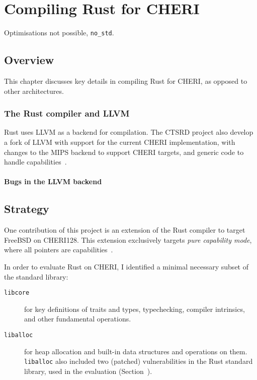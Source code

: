\documentclass[dissertation.tex]{subfiles}
\begin{document}
\chapter{Compiling Rust for CHERI}
\label{ch:impl}

Optimisations not possible, \texttt{no\_std}.


\section{Overview}

This chapter discusses key details in compiling Rust for CHERI, as
opposed to other architectures.


\subsection{The Rust compiler and LLVM}
\label{sec:impl-rustllvm}

Rust uses LLVM as a backend for compilation.
The CTSRD project also develop a fork of LLVM with support for the
current CHERI implementation, with changes to the MIPS backend to
support CHERI targets, and generic code to handle
capabilities~\cite{cheri-prog-guide}.

\subsubsection{Bugs in the LLVM backend}


\section{Strategy}
\label{sec:impl-what}

One contribution of this project is an extension of the Rust compiler to
target FreeBSD on CHERI128.
This extension exclusively targets \emph{pure capability mode}, where
all pointers are capabilities~\cite{cheri-prog-guide}.

In order to evaluate  Rust on CHERI, I identified
a minimal necessary subset of the standard library:

\begin{description}
    \item[\texttt{libcore}] for key definitions of traits and types,
    typechecking, compiler intrinsics, and other fundamental operations.
    \item[\texttt{liballoc}] for heap allocation and built-in data
    structures and operations on them.
    \texttt{liballoc} also included two (patched) vulnerabilities in the
    Rust standard library, used in the evaluation (Section~).
\end{description}
\end{document}
